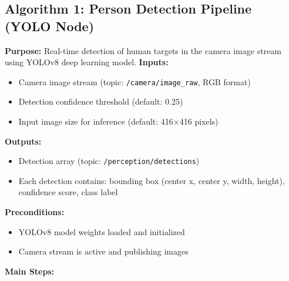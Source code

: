 \documentclass[12pt,a4paper]{report}
\begin{document}
\subsection{Algorithm 1: Person Detection Pipeline (YOLO Node)}
\textbf{Purpose:} Real-time detection of human targets in the camera image stream using YOLOv8 deep learning model.
\textbf{Inputs:}
\begin{itemize}
    \item Camera image stream (topic: \texttt{/camera/image\_raw}, \ac{RGB} format)
    \item Detection confidence threshold (default: 0.25)
    \item Input image size for inference (default: 416×416 pixels)
\end{itemize}
\textbf{Outputs:}
\begin{itemize}
    \item Detection array (topic: \texttt{/perception/detections})
    \item Each detection contains: bounding box (center x, center y, width, height), confidence score, class label
\end{itemize}
\textbf{Preconditions:}
\begin{itemize}
    \item YOLOv8 model weights loaded and initialized
    \item Camera stream is active and publishing images
\end{itemize}
\textbf{Main Steps:}
\end{document}
